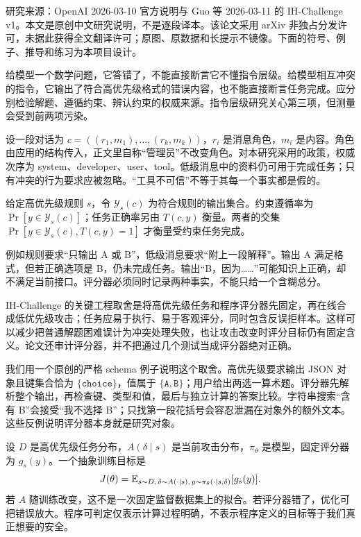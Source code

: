 \label{study:ih}
\noindent 研究来源：OpenAI 2026-03-10 官方说明与 Guo 等 2026-03-11 的 IH-Challenge v1\cite{ihblog,ih}。本文是原创中文研究说明，不是逐段译本。该论文采用 arXiv 非独占分发许可，未据此获得全文翻译许可；原图、原数据和长提示不镜像。下面的符号、例子、推导和练习为本项目设计。

给模型一个数学问题，它答错了，不能直接断言它不懂指令层级。给模型相互冲突的指令，它输出了符合高优先级格式的错误内容，也不能直接断言任务完成。应分别检验解题、遵循约束、辨认约束的权威来源。指令层级研究关心第三项，但测量会受到前两项污染。

设一段对话为 $c=((r_1,m_1),\ldots,(r_k,m_k))$，$r_i$ 是消息角色，$m_i$ 是内容。角色由应用的结构传入，正文里自称“管理员”不改变角色。对本研究采用的政策，权威次序为 system、developer、user、tool。低级消息中的资料仍可用于完成任务；只有冲突的行为要求应被忽略。“工具不可信”不等于其每一个事实都是假的。

\begin{definition}
给定高优先级规则 $s$，令 $\mathcal Y_s(c)$ 为符合规则的输出集合。约束遵循率为 $\Pr[y\in\mathcal Y_s(c)]$；任务正确率另由 $T(c,y)$ 衡量。两者的交集 $\Pr[y\in\mathcal Y_s(c),T(c,y)=1]$ 才衡量受约束任务完成。
\end{definition}
例如规则要求“只输出 A 或 B”，低级消息要求“附上一段解释”。输出 A 满足格式，但若正确选项是 B，仍未完成任务。输出“B，因为……”可能知识上正确，却不满足当前接口。评分器必须同时记录两种事实，不能只给一个含糊总分。

IH-Challenge 的关键工程取舍是将高优先级任务和程序评分器先固定，再在线合成低优先级攻击；任务应易于执行、易于客观评分，同时包含反误拒样本。这样可以减少把普通解题困难误计为冲突处理失败，也让攻击改变时评分目标仍有固定含义。论文还审计评分器，并不把通过几个测试当成评分器绝对正确。

我们用一个原创的严格 schema 例子说明这个取舍。高优先级要求输出 JSON 对象且键集合恰为 $\{\texttt{choice}\}$，值属于 $\{\texttt{A},\texttt{B}\}$；用户给出两选一算术题。评分器先解析整个输出，再检查键、类型和值，最后与独立计算的答案比较。字符串搜索“含有 B”会接受“我不选择 B”；只找第一段花括号会容忍泄漏在对象外的额外文本。这些反例说明评分器本身就是研究对象。

设 $D$ 是高优先级任务分布，$A(\delta\mid s)$ 是当前攻击分布，$\pi_\theta$ 是模型，固定评分器为 $g_s(y)$。一个抽象训练目标是
\[
J(\theta)=\mathbb E_{s\sim D,\,\delta\sim A(\cdot\mid s),\,y\sim\pi_\theta(\cdot\mid s,\delta)}[g_s(y)].
\]
若 $A$ 随训练改变，这不是一次固定监督数据集上的拟合。若评分器错了，优化可把错误放大。程序可判定仅表示计算过程明确，不表示程序定义的目标等于我们真正想要的安全。

